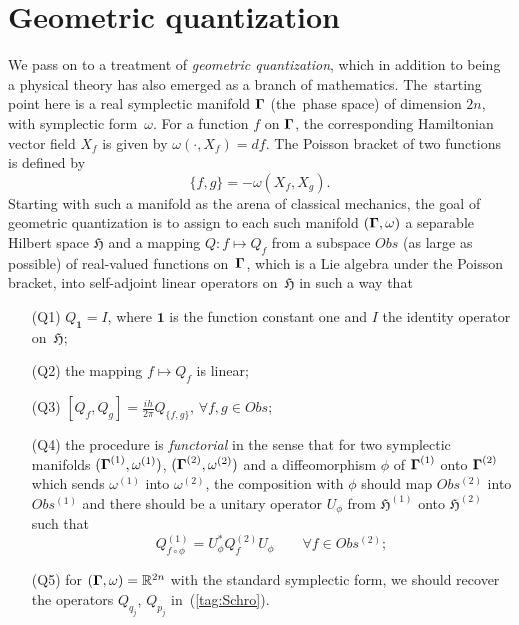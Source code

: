 \documentclass[12pt]{amsart}
\numberwithin{equation}{section}
\theoremstyle{remark}
\let\boldkey\mathbf \let\bold\mathbf
\newcommand\jedna{{\boldkey1}}
\newcommand\Obs{Obs}
\newcommand\Omg{{\bigam}}   %
\newcommand\HH{\mathfrak H}
\newcommand\RR{\mathbb R}
\newcommand{\bigam}{\mbox{\boldmath $\Gamma$}}
\begin{document}
\section{Geometric quantization}\label{sec2}
We pass on to a treatment of {\em geometric quantization\/}, which in addition
to being a physical theory has also emerged as a branch of mathematics.
The~starting point here is  a real symplectic manifold $\Omg$ (the~phase space)
of dimension $2n$, with symplectic form~$\omega$. For a function $f$ on $\Omg$,
the corresponding Hamiltonian vector field $X_f$ is given by
$\omega(\cdot,X_f)=df$. The Poisson bracket of two functions is defined by
\begin{equation}  \{f,g\} = -\omega(X_f,X_g).  \label{tag:PBG}  \end{equation}
Starting with such a manifold as the arena of classical mechanics, the goal of
geometric quantization is to assign to each such manifold $(\Omg,\omega)$ a
separable Hilbert space $\HH$ and a mapping $Q:f\mapsto Q_f$ from a subspace
$\Obs$ (as large as possible) of real-valued functions on~$\Omg$, which is a
Lie algebra under the Poisson bracket, into self-adjoint linear operators
on~$\HH$ in such a way that
\begin{enumerate}
\item[(Q1)] $Q_\jedna=I$, where $\jedna$ is the function constant one and $I$
the identity operator on~$\HH$;
\item[(Q2)] the mapping $f\mapsto Q_f$ is linear;
\item[(Q3)] $[Q_f,Q_g]=\frac{ih}{2\pi} Q_{\{f,g\}}$, \;\; $\forall f,g\in\Obs$;
\item[(Q4)] the procedure is {\it functorial\/} in the sense that for two
symplectic manifolds $(\Omg^{(1)},\omega^{(1)})$, $(\Omg^{(2)},\omega^{(2)})$
and a diffeomorphism $\phi$ of $\Omg^{(1)}$ onto $\Omg^{(2)}$ which sends
$\omega^{(1)}$ into $\omega^{(2)}$, the composition with $\phi$ should map
$\Obs^{(2)}$ into $\Obs^{(1)}$ and there should be a unitary operator $U_\phi$
from $\HH^{(1)}$ onto $\HH^{(2)}$ such that
\begin{equation}  Q^{(1)}_{f\circ\phi} = U_\phi^* Q^{(2)}_f U_\phi \qquad
\forall f\in\Obs^{(2)} ;  \label{tag:COV}  \end{equation}
\item[(Q5)] for $(\Omg,\omega)=\RR^{2n}$ with the standard symplectic form, we
should recover the operators $Q_{q_j}$, $Q_{p_j}$ in~(\ref{tag:Schro}).
\end{enumerate}
\end{document}
